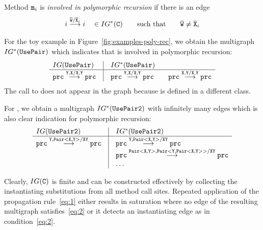 \begin{definition}\label{def:method-in-poly-rec}
  Method ${\tt m}_i$ is \emph{involved in polymorphic recursion}
  if there is an edge
  \begin{gather}\label{eq:2}
    i \stackrel{\overline{\tt W}/\overline{\tt X}_i}{\longrightarrow} i \quad \in IG^*
    ({\tt C}) \qquad \text{such that} \qquad \overline{\tt W} \ne \overline{\tt X}_i
  \end{gather}
\end{definition}
For the toy example in Figure~\ref{fig:examples-poly-rec}, we obtain
the multigraph $IG^* ({\tt UsePair})$ which indicates that  is
involved in polymorphic recursion:
\begin{gather*}
  \begin{array}{l@{\quad}|@{\quad}l}
    IG(\mv{UsePair})& IG^* (\mv{UsePair}) \\\hline
    \mv{prc} \stackrel{\mv{Y,X}/\mv{X,Y}}{\longrightarrow} \mv{prc} &
    \mv{prc} \stackrel{\mv{Y,X}/\mv{X,Y}}{\longrightarrow} \mv{prc} \qquad
    \mv{prc} \stackrel{\mv{X,Y}/\mv{X,Y}}{\longrightarrow} \mv{prc}
  \end{array}
\end{gather*}
The call to  does not appear in the graph because
 is defined in a different class.

For , we obtain a multigraph $IG^* ({\tt UsePair2})$ with
infinitely many edges which is also clear indication for polymorphic recursion:
\begin{gather*}
  \begin{array}{l@{\quad}|@{\quad}l}
    IG(\mv{UsePair2})& IG^* (\mv{UsePair2}) \\\hline
    \mv{prc} \stackrel{\mv{Y,Pair<X,Y>}/\mv{XY}}{\longrightarrow} \mv{prc}
    &
    \mv{prc} \stackrel{\mv{Y,Pair<X,Y>}/\mv{XY}}{\longrightarrow}
      \mv{prc} \\
    &
      \mv{prc}
      \stackrel{\mv{Pair<X,Y>,Pair<Y,Pair<X,Y>>}/\mv{XY}}{\longrightarrow}
      \mv{prc}
      \\
                     & \dots
  \end{array}
\end{gather*}


Clearly, $IG ({\tt C})$ is finite and can be constructed effectively by
collecting the instantiating substitutions from all method call
sites.
Repeated application of the propagation rule~\eqref{eq:1} either
results in saturation where no edge of the resulting multigraph satisfies~\eqref{eq:2} or it
detects an instantiating edge as in condition~\eqref{eq:2}. 

